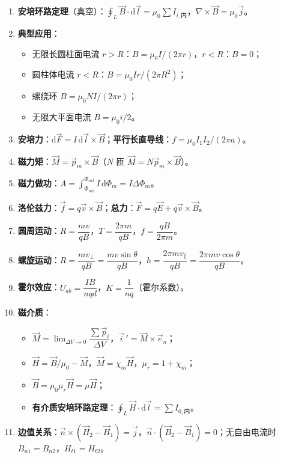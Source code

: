 \documentclass[12pt,a4paper]{ctexart}
\begin{document}
\begin{enumerate}[leftmargin=3em,label=\textbf{公式\arabic*}：,ref=公式\arabic*]
    \item \textbf{安培环路定理}（真空）：$\displaystyle\oint_L\vec B\cdot\mathrm d\vec l=\mu_0\sum I_{i,\text{内}}$，$\nabla\times\vec B=\mu_0\vec j$。

    \item \textbf{典型应用}：
    \begin{itemize}
        \item 无限长圆柱面电流 $r>R$：$B=\mu_0 I/(2\pi r)$，$r<R$：$B=0$；
        \item 圆柱体电流 $r<R$：$B=\mu_0 I r/(2\pi R^2)$；
        \item 螺绕环 $B=\mu_0 NI/(2\pi r)$；
        \item 无限大平面电流 $B=\mu_0 i/2$。
    \end{itemize}

    \item \textbf{安培力}：$\mathrm d\vec F=I\,\mathrm d\vec l\times\vec B$；\textbf{平行长直导线}：$f=\mu_0 I_1 I_2/(2\pi a)$。

    \item \textbf{磁力矩}：$\vec M=\vec p_m\times\vec B$（$N$ 匝 $\vec M=N\vec p_m\times\vec B$）。

    \item \textbf{磁力做功}：$A=\displaystyle\int_{\Phi_{m1}}^{\Phi_{m2}}I\,\mathrm d\Phi_m=I\Delta\Phi_m$。

    \item \textbf{洛伦兹力}：$\vec f=q\vec v\times\vec B$；\textbf{总力}：$\vec F=q\vec E+q\vec v\times\vec B$。

    \item \textbf{圆周运动}：$R=\dfrac{mv}{qB}$，$T=\dfrac{2\pi m}{qB}$，$f=\dfrac{qB}{2\pi m}$。

    \item \textbf{螺旋运动}：$R=\dfrac{mv_\perp}{qB}=\dfrac{mv\sin\theta}{qB}$，$h=\dfrac{2\pi mv_\parallel}{qB}=\dfrac{2\pi mv\cos\theta}{qB}$。

    \item \textbf{霍尔效应}：$U_{ab}=\dfrac{IB}{nqd}$，$K=\dfrac{1}{nq}$（霍尔系数）。

    \item \textbf{磁介质}：
    \begin{itemize}
        \item $\vec M=\displaystyle\lim_{\Delta V\to 0}\dfrac{\sum\vec p_i}{\Delta V}$，$\vec i\,'=\vec M\times\vec e_n$；
        \item $\vec H=\vec B/\mu_0-\vec M$，$\vec M=\chi_m\vec H$，$\mu_r=1+\chi_m$；
        \item $\vec B=\mu_0\mu_r\vec H=\mu\vec H$；
        \item \textbf{有介质安培环路定理}：$\displaystyle\oint_L\vec H\cdot\mathrm d\vec l=\sum I_{0,\text{内}}$。
    \end{itemize}

    \item \textbf{边值关系}：$\vec n\times(\vec H_2-\vec H_1)=\vec j$，$\vec n\cdot(\vec B_2-\vec B_1)=0$；无自由电流时 $B_{n1}=B_{n2}$，$H_{t1}=H_{t2}$。

\end{enumerate}
\end{document}
